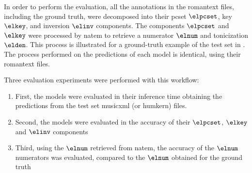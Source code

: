 
In order to perform the evaluation, all the annotations in
the \gls{romantext} files, including the ground truth, were
decomposed into their \gls{pcset} $\elpcset$, key $\elkey$,
and inversion $\elinv$ components. The components $\elpcset$
and $\elkey$ were processed by \gls{natem} to retrieve a
numerator $\elnum$ and tonicization $\elden$. This process
is illustrated for a ground-truth example of the test set in
. The process performed on the
predictions of each model is identical, using their
\gls{romantext} files.

Three evaluation experiments were performed with this
workflow:
\begin{enumerate}
    \item First, the models were evaluated in their
    inference time obtaining the predictions from the test
    set \gls{musicxml} (or \gls{humkern}) files.
    \item Second, the models were evaluated in the accuracy
    of their $\elpcset$, $\elkey$ and $\elinv$ components
    \item Third, using the $\elnum$ retrieved from
    \gls{natem}, the accuracy of the $\elnum$ numerators was
    evaluated, compared to the $\elnum$ obtained for the
    ground truth
\end{enumerate}




